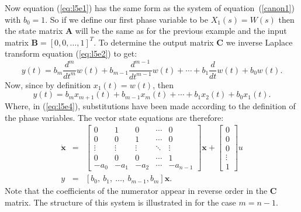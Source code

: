 Now equation (\ref{eq:l5e1}) has the same form as the system of equation~(\ref{canon1})
with $b_0 = 1$. So if we define our first phase variable to be $X_1(s) = W(s)$ then the state matrix $\mathbf{A}$ will be the same as for the previous example and the input matrix $\mathbf{B} = \left[0, 0, \ldots, 1\right]^T$. To determine the output matrix $\mathbf{C}$ we inverse Laplace transform equation (\ref{eq:l5e2}) to get:
\begin{equation}\label{eq:l5e3}
y(t) = b_m\frac{d^m}{dt^m}w(t) +
b_{m-1}\frac{d^{m-1}}{dt^{m-1}}w(t)+\cdots+b_1\frac{d}{dt}w(t)+
b_0w(t).
\end{equation}
Now, since by definition $x_1(t) = w(t)$, then
\begin{equation}
y(t) = b_mx_{m+1}(t) + b_{m-1}x_m(t)+\cdots+b_1x_2(t)+
b_0x_1(t).\label{eq:l5e4}
\end{equation}
Where, in (\ref{eq:l5e4}), substitutions have been made according
to the definition of the phase variables. The vector state
equations are therefore: \begin{eqnarray*} \dot{\mathbf{x}} &=&
\left[\begin{array}{ccccc}
  0 & 1 & 0 & \cdots & 0 \\
  0 & 0 & 1 & \cdots & 0 \\
  \vdots & \vdots & \vdots & \ddots & \vdots \\
  0 & 0 & 0 & \cdots & 1 \\
  -a_{0} & -a_{1} & -a_{2} & \cdots & -a_{n-1}
\end{array}\right]\mathbf{x}+\left[\begin{array}{c}
  0 \\
  0 \\
  0 \\
  \vdots \\
  1
\end{array}\right]u\\
y & = & [b_0,\ b_1,\ \dots,\ b_{m-1}, b_m]
\mathbf{x}.\end{eqnarray*} Note that the coefficients of the
numerator appear in reverse order in the $\mathbf{C}$ matrix. The
structure of this system is illustrated in  for
the case $m=n-1$.
\begin{slide}\label{slide:l5s4}
\end{slide}

